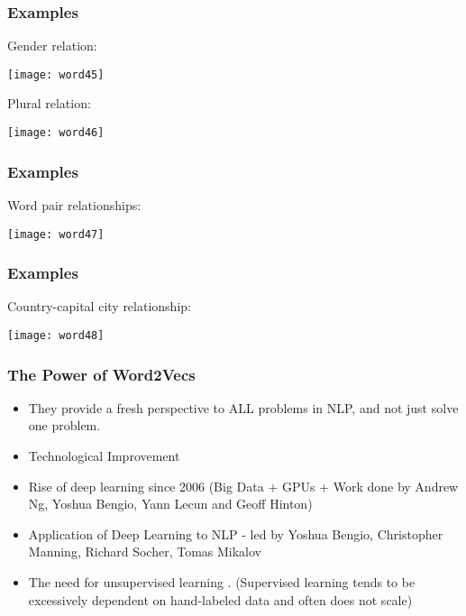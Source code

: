 \begin{frame}[fragile]\frametitle{Examples}
Gender relation:
\begin{center}
\texttt{[image: word45]}
\end{center}
Plural relation:

\begin{center}
\texttt{[image: word46]}
\end{center}

\end{frame}

\begin{frame}[fragile]\frametitle{Examples}
Word pair relationships:
\begin{center}
\texttt{[image: word47]}
\end{center}
\end{frame}

\begin{frame}[fragile]\frametitle{Examples}
Country-capital city relationship:

\begin{center}
\texttt{[image: word48]}
\end{center}

\end{frame}

\begin{frame}[fragile]\frametitle{The Power of Word2Vecs}

\begin{itemize}
\item They provide a fresh perspective to ALL  problems in NLP, and not just solve one problem.
\item Technological Improvement
\item Rise of deep learning since 2006 (Big Data + GPUs  + Work done by Andrew Ng, Yoshua Bengio, Yann Lecun and Geoff Hinton)
\item Application of Deep Learning to NLP - led by Yoshua Bengio,  Christopher Manning, Richard Socher, Tomas Mikalov
\item The need for unsupervised learning . (Supervised learning tends to be excessively dependent on hand-labeled data and often does not scale)
\end{itemize}
\end{frame}


